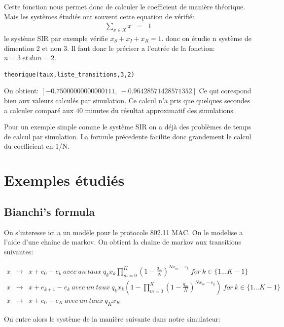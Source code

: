 \documentclass[a4paper]{article}
\begin{document}
Cette fonction nous permet donc de calculer le coefficient de manière
théorique. Mais les systèmes étudiés ont souvent cette equation de
vérifié:
\begin{eqnarray*}
  \sum_{x \in X}x &=& 1
\end{eqnarray*}
le système SIR par exemple vérifie $x_S+x_I+x_R=1$. donc on étudie n
système de dimention 2 et non 3. Il faut donc le préciser a l'entrée
de la fonction: $n=3 \ et \ dim=2$.

\begin{lstlisting}[frame=single]
  theorique(taux,liste_transitions,3,2)
\end{lstlisting}

On obtient: $[-0.75000000000000111,\ -0.96428571428571352]$
Ce qui corespond bien aux valeurs calculés par simulation. Ce calcul
n'a pris que quelques secondes a calculer comparé aux 40 minutes du
résultat approximatif des simulations.

Pour un exemple simple comme le système SIR on a déjà des problèmes de
temps de calcul par simulation. La formule précedente facilite donc
grandement le calcul du coefficient en 1/N.


\section{Exemples étudiés}

\subsection{Bianchi's formula}
On s'interesse ici a un modèle \cite{bianchi} pour le protocole 802.11 MAC. On le
modelise a l'aide d'une chaine de markov. On obtient la chaine de
markov aux transitions suivantes:

\begin{eqnarray*}
  x & \rightarrow & x+e_0-e_k \ avec\ un\ taux \
  q_kx_k\prod_{m=0}^K(1-\frac{q_m}{N})^{Nx_m-e_k} \ for \ k \in
                    \{1...K-1\} \\
  x & \rightarrow & x+e_{k+1}-e_k \ avec\ un\ taux \
  q_kx_k(1-\prod_{m=0}^K(1-\frac{q_m}{N})^{Nx_m-e_k}) \ for \ k \in
                    \{1...K-1\} \\
  x & \rightarrow & x+e_0-e_K \ avec \ un \ taux \ q_Kx_K
\end{eqnarray*}

On entre alors le système de la manière suivante dans notre
simulateur:
\end{document}
